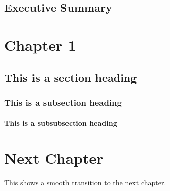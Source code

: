 \documentclass[oneside,12pt]{book}
\begin{document}

\clearpage
\pagestyle{plain}
\setcounter{page}{1}
\tableofcontents


\clearpage

\section*{Executive Summary}


\mainmatter
\pagestyle{fancy}


\chapter{Chapter 1}

\section{This is a section heading}

\subsection{This is a subsection heading}

\subsubsection{This is a subsubsection heading}

\chapter{Next Chapter}

This shows a smooth transition to the next chapter.










% 
% 

\end{document}
